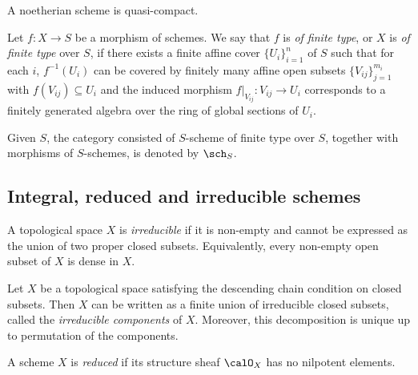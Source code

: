     \begin{proposition}\label{prop:noetherian_scheme_is_quasi_compact}
        A noetherian scheme is quasi-compact.
    \end{proposition}

    \begin{definition}\label{def:scheme_of_finite_type_over_base_scheme}
        Let \(f:X \to S\) be a morphism of schemes.
        We say that \(f\) is \emph{of finite type}, or \(X\) is \emph{of finite type} over \(S\), 
        if there exists a finite affine cover \(\{U_i\}_{i=1}^n\) of \(S\) such that for each \(i\), 
        \(f^{-1}(U_i)\) can be covered by finitely many affine open subsets \(\{V_{ij}\}_{j=1}^{m_i}\) with \(f(V_{ij}) \subseteq U_i\) 
        and the induced morphism \(f|_{V_{ij}} : V_{ij} \to U_i\) corresponds to a finitely generated algebra over the ring of global sections of \(U_i\).

        Given \(S\), the category consisted of \(S\)-scheme of finite type over \(S\), together with morphisms of \(S\)-schemes, is denoted by \(\sch_S\).
    \end{definition}


\subsection{Integral, reduced and irreducible schemes}

    \begin{definition}\label{def:irreducible_topological_space}
        A topological space \(X\) is \emph{irreducible} if it is non-empty and cannot be expressed as the union of two proper closed subsets.
        Equivalently, every non-empty open subset of \(X\) is dense in \(X\).
    \end{definition}

    \begin{proposition}\label{prop:irreducible_components_and_primary_decomposition}
        Let \(X\) be a topological space satisfying the descending chain condition on closed subsets.
        Then \(X\) can be written as a finite union of irreducible closed subsets, called the \emph{irreducible components} of \(X\).
        Moreover, this decomposition is unique up to permutation of the components.
    \end{proposition}

    \begin{definition}\label{def:reduced_scheme}
        A scheme \(X\) is \emph{reduced} if its structure sheaf \(\calO_X\) has no nilpotent elements.
    \end{definition}

